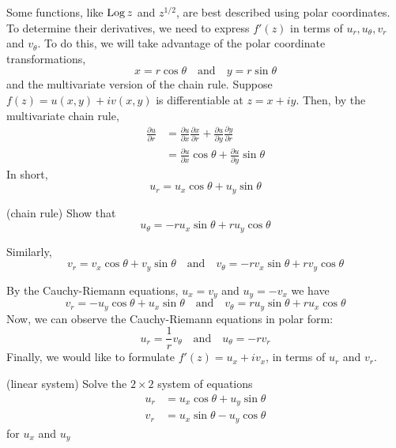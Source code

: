 \documentclass[handout]{ximera}
\begin{document}
Some functions, like $\operatorname{Log} z$ and $z^{1/2}$, are best described using polar coordinates. 
To determine their derivatives, we need 
to express $f'(z)$ in terms of $u_r, u_\theta, v_r$ and $v_\theta$. 
To do this, we will take advantage of the polar coordinate transformations,
\[
x = r\cos \theta \quad \mbox{and} \quad y=r\sin \theta
\]
and the multivariate version of the chain rule.
Suppose $f(z) = u(x,y) + iv(x,y)$ is differentiable at $z = x+iy$.
Then, by the multivariate chain rule,
\begin{align*}
\frac{\partial u}{\partial r} &= \frac{\partial u}{\partial x}\frac{\partial x}{\partial r}+\frac{\partial u}{\partial y}\frac{\partial y}{\partial r}\\
                              &= \frac{\partial u}{\partial x} \cos\theta + \frac{\partial u}{\partial y} \sin \theta
\end{align*}
In short,
\[
u_r = u_x \cos \theta + u_y \sin\theta
\]


\begin{problem}(chain rule)
Show that
\[
u_\theta = -ru_x \sin \theta + ru_y \cos\theta
\]
\end{problem}


Similarly,
\[
 v_r = v_x \cos \theta + v_y \sin\theta \quad \mbox{and} \quad  v_\theta = -rv_x \sin \theta + rv_y \cos\theta
\]

By the Cauchy-Riemann equations, $u_x = v_y$ and $u_y = -v_x$ we have
\[
v_r = -u_y \cos \theta + u_x \sin\theta \quad \mbox{and} \quad  v_\theta = ru_y \sin \theta + ru_x \cos\theta
\]
Now, we can observe the Cauchy-Riemann equations in polar form:
\[
u_r = \frac{1}{r} v_\theta \quad \mbox{and} \quad u_\theta = -rv_r
\]
Finally, we would like to formulate $f'(z) = u_x + iv_x$, in terms of $u_r$ and $v_r$.


\begin{problem}(linear system)
 Solve the $2 \times 2$ system of equations
\begin{align*}
u_r &= u_x \cos \theta + u_y \sin\theta\\
v_r &= u_x \sin \theta -u_y \cos\theta
\end{align*}
for $u_x$ and $u_y$
\begin{multipleChoice}
\end{multipleChoice}
\end{problem}
\end{document}
